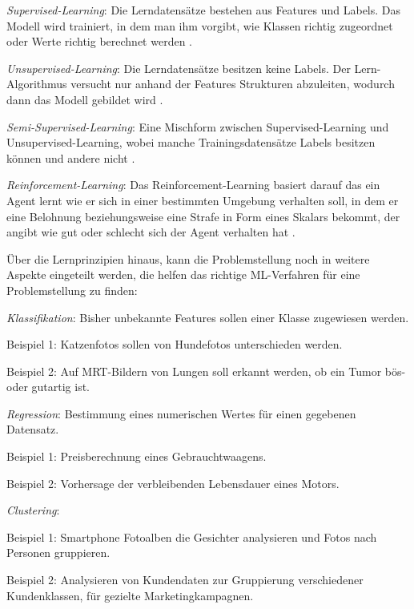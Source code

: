 \begin{itemize*}
\item \emph{Supervised-Learning}: Die Lerndatensätze bestehen aus Features und Labels. Das Modell wird trainiert, in dem man ihm vorgibt, wie Klassen richtig zugeordnet oder Werte richtig berechnet werden \cite[vgl. S. 68]{EM17}. 
\item \emph{Unsupervised-Learning}: Die Lerndatensätze besitzen keine Labels. Der Lern-Algorithmus versucht nur anhand der Features Strukturen abzuleiten, wodurch dann das Modell gebildet wird \cite[]{SG17, EM17}. 
\item \emph{Semi-Supervised-Learning}: Eine Mischform zwischen Supervised-Learning und Unsupervised-Learning, wobei manche Trainingsdatensätze Labels besitzen können und andere nicht \cite[vgl. S. 892]{ZH10}. 
\item \emph{Reinforcement-Learning}: Das Reinforcement-Learning basiert darauf das ein Agent lernt wie er sich in einer bestimmten Umgebung verhalten soll, in dem er eine Belohnung beziehungsweise eine Strafe in Form eines Skalars bekommt, der angibt wie gut oder schlecht sich der Agent verhalten hat \cite[vgl. S. 5]{WO12}.  
\end{itemize*}    

Über die Lernprinzipien hinaus, kann die Problemstellung noch in weitere Aspekte eingeteilt werden, die helfen das richtige ML-Verfahren für eine Problemstellung zu finden:

\begin{itemize*}

\item \emph{Klassifikation}: Bisher unbekannte Features sollen einer Klasse zugewiesen werden. 
\begin{itemize*}
\item Beispiel 1: Katzenfotos sollen von Hundefotos unterschieden werden.
\item Beispiel 2: Auf MRT-Bildern von Lungen soll erkannt werden, ob ein Tumor bös- oder gutartig ist.
\end{itemize*}
\item \emph{Regression}: Bestimmung eines numerischen Wertes für einen gegebenen Datensatz.   
\begin{itemize*}
\item Beispiel 1: Preisberechnung eines Gebrauchtwaagens.  
\item Beispiel 2: Vorhersage der verbleibenden Lebensdauer eines Motors.
\end{itemize*}
\item \emph{Clustering}:  
\begin{itemize*}
\item Beispiel 1: Smartphone Fotoalben die Gesichter analysieren und Fotos nach Personen gruppieren.  
\item Beispiel 2: Analysieren von Kundendaten zur Gruppierung verschiedener Kundenklassen, für gezielte Marketingkampagnen. 
\end{itemize*}

\end{itemize*}   


